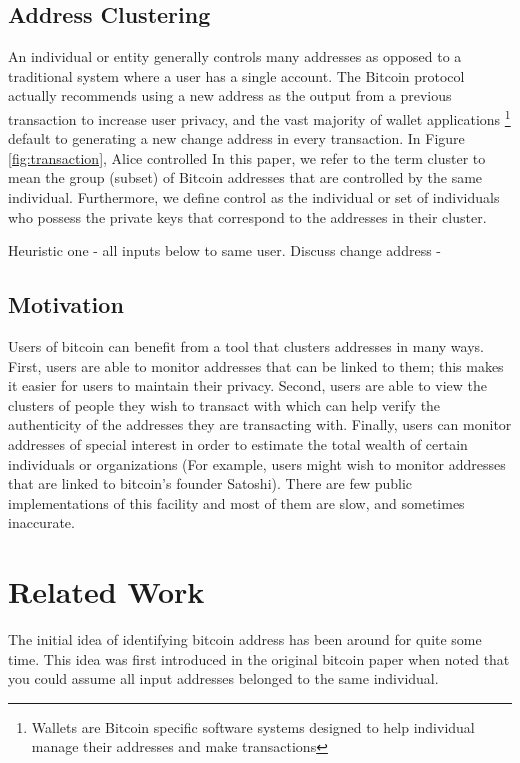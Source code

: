 \documentclass[10pt, letterpaper, twocolumn, twoside]{article}
\begin{document}
\subsection{Address Clustering}

An individual or entity generally controls many addresses as opposed to a traditional system where a user has a single account. The Bitcoin protocol actually recommends using a new address as the output from a previous transaction to increase user privacy, and the vast majority of wallet applications \footnote{Wallets are Bitcoin specific software systems designed to help individual manage their addresses and make transactions} default to generating a new change address in every transaction. In Figure \ref{fig:transaction}, Alice controlled  In this paper, we refer to the term cluster to mean the group (subset) of Bitcoin addresses that are controlled by the same individual. Furthermore, we define control as the individual or set of individuals who possess the private keys that correspond to the addresses in their cluster.

Heuristic one - all inputs below to same user.
Discuss change address - 

\subsection{Motivation}

Users of bitcoin can benefit from a tool that clusters addresses in many ways. First, users are able to monitor addresses that can be linked to them; this makes it easier for users to maintain their privacy. Second, users are able to view the clusters of people they wish to transact with which can help verify the authenticity of the addresses they are transacting with. Finally, users can monitor addresses of special interest in order to estimate the total wealth of certain individuals or organizations (For example, users might wish to monitor addresses that are linked to bitcoin's founder Satoshi). There are few public implementations of this facility and most of them are slow, and sometimes inaccurate.

\section{Related Work}
\label{related}
The initial idea of identifying bitcoin address has been around for quite some time. This idea was first introduced in the original bitcoin paper when noted that you could assume all input addresses belonged to the same individual.
\end{document}

